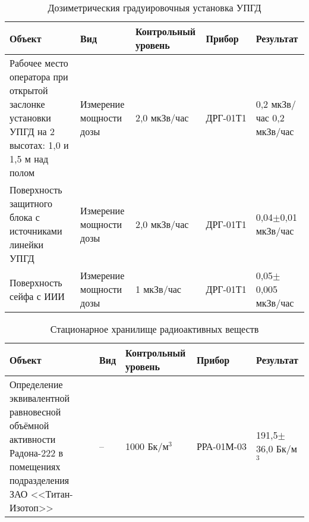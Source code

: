 	\begin{table}[ht]
		\centering
		\caption{Дозиметрическия градуировочныя установка УПГД}
		\begin{tabular}{|p{4cm}|p{2.5cm}|p{3cm}|p{2.8cm}|p{2.5cm}|}
			\hline
			Объект & Вид & Контрольный уровень & Прибор & Результат \\ \hline
			Рабочее место оператора при открытой заслонке установки УПГД на 2 
				высотах: 1,0 и 1,5 м над полом & Измерение мощности дозы & 
				2,0 мкЗв/час & ДРГ-01Т1 & 0,2 мкЗв/час 0,2 мкЗв/час \\ \hline
			Поверхность защитного блока с источниками линейки УПГД & 
				Измерение мощности дозы & 2,0 мкЗв/час & ДРГ-01Т1 & 
				0,04\( \pm \)0,01 мкЗв/час \\ \hline
			Поверхность сейфа с ИИИ & Измерение мощности дозы & 1 мкЗв/час & 
				ДРГ-01Т1 & 0,05\( \pm \)0,005 мкЗв/час \\ \hline
		\end{tabular}
	\end{table}

	\begin{table}[ht]
		\centering
		\caption{Стационарное хранилище радиоактивных веществ}
		\begin{tabular}{|p{4cm}|p{2.5cm}|p{3cm}|p{2.8cm}|p{2.5cm}|}
			\hline
			Объект & Вид & Контрольный уровень & Прибор & Результат \\ \hline
			Определение эквивалентной равновесной объёмной активности Радона-222 
				в помещениях подразделения ЗАО <<Титан-Изотоп>> & -- & 
				1000 Бк/м\(^3\) & РРА-01М-03 & 191,5\( \pm \)36,0 Бк/м\(^3\) \\ \hline
		\end{tabular}
	\end{table}

\clearpage
